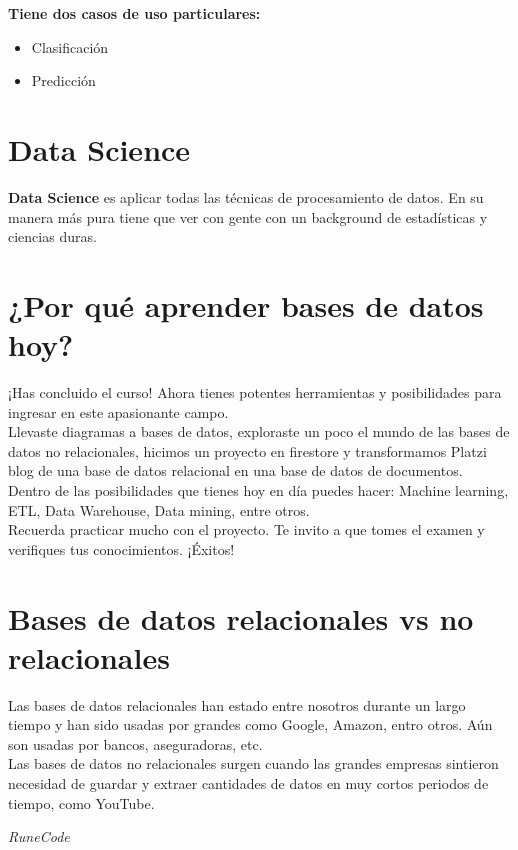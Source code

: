 \documentclass{article}
\begin{document}
\textbf{Tiene dos casos de uso particulares:}
\begin{itemize}
  \item Clasificación
  \item Predicción
\end{itemize}


\section{Data Science}%
\textbf{Data Science} es aplicar todas las técnicas de procesamiento de datos.
En su manera más pura tiene que ver con gente con un background de estadísticas
y ciencias duras.


\section{¿Por qué aprender bases de datos hoy?}%
¡Has concluido el curso! Ahora tienes potentes herramientas y posibilidades
para ingresar en este apasionante campo.\\

Llevaste diagramas a bases de datos, exploraste un poco el mundo de las bases
de datos no relacionales, hicimos un proyecto en firestore y transformamos
Platzi blog de una base de datos relacional en una base de datos de
documentos.\\

Dentro de las posibilidades que tienes hoy en día puedes hacer: Machine
learning, ETL, Data Warehouse, Data mining, entre otros.\\

Recuerda practicar mucho con el proyecto. Te invito a que tomes el examen y
verifiques tus conocimientos. ¡Éxitos!

\section{Bases de datos relacionales vs no relacionales}%
Las bases de datos relacionales han estado entre nosotros durante un largo
tiempo y han sido usadas por grandes como Google, Amazon, entro otros. Aún son
usadas por bancos, aseguradoras, etc.\\

Las bases de datos no relacionales surgen cuando las grandes empresas sintieron
necesidad de guardar y extraer cantidades de datos en muy cortos periodos de
tiempo, como YouTube.


\vspace{2cm}
\LARGE\textit{RuneCode}
\end{document}

